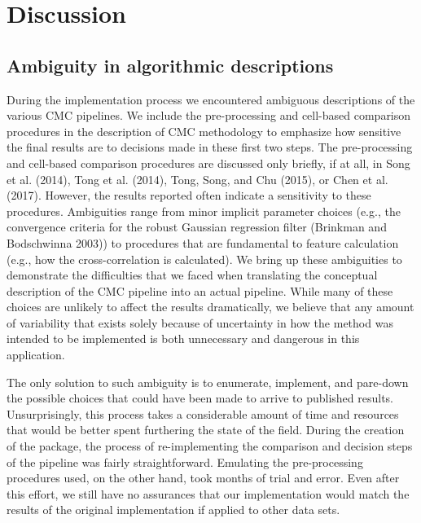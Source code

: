 \hypertarget{discussion}{%
\section{Discussion}\label{discussion}}

\hypertarget{ambiguities}{%
\subsection{Ambiguity in algorithmic descriptions}\label{ambiguities}}

During the implementation process we encountered ambiguous descriptions of the various CMC pipelines.
We include the pre-processing and cell-based comparison procedures in the description of CMC methodology to emphasize how sensitive the final results are to decisions made in these first two steps.
The pre-processing and cell-based comparison procedures are discussed only briefly, if at all, in Song et al. (2014), Tong et al. (2014), Tong, Song, and Chu (2015), or Chen et al. (2017).
However, the results reported often indicate a sensitivity to these procedures.
Ambiguities range from minor implicit parameter choices (e.g., the convergence criteria for the robust Gaussian regression filter (Brinkman and Bodschwinna 2003)) to procedures that are fundamental to feature calculation (e.g., how the cross-correlation is calculated).
We bring up these ambiguities to demonstrate the difficulties that we faced when translating the conceptual description of the CMC pipeline into an actual pipeline.
While many of these choices are unlikely to affect the results dramatically, we believe that any amount of variability that exists solely because of uncertainty in how the method was intended to be implemented is both unnecessary and dangerous in this application.

The only solution to such ambiguity is to enumerate, implement, and pare-down the possible choices that could have been made to arrive to published results.
Unsurprisingly, this process takes a considerable amount of time and resources that would be better spent furthering the state of the field.
During the creation of the  package, the process of re-implementing the comparison and decision steps of the pipeline was fairly straightforward.
Emulating the pre-processing procedures used, on the other hand, took months of trial and error.
Even after this effort, we still have no assurances that our implementation would match the results of the original implementation if applied to other data sets.

